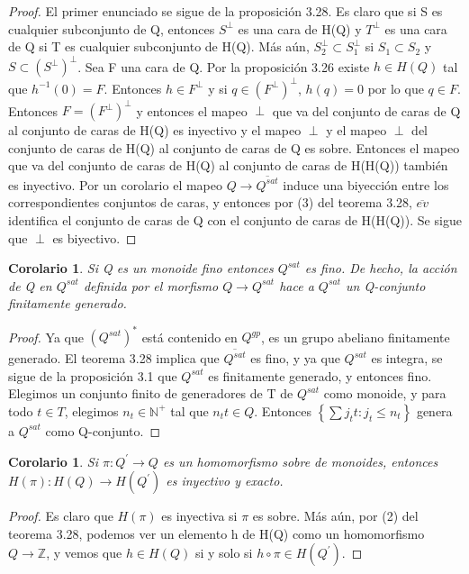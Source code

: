 \documentclass[12pt,spanish]{amsart}
\newcommand{\bb}[1]{\mathbb{#1}}
\newcommand{\set}[1]{\left\{{#1}\right\}}
\newtheorem{cor}[Theorem]{Corolario}
\theoremstyle{definition}
\theoremstyle{remark}
\begin{document}
\begin{proof}
El primer enunciado se sigue de la proposición 3.28. Es claro que si S es cualquier subconjunto de Q, entonces $S^{\perp}$ es una cara de H(Q) y $T^{\perp}$ es una cara de Q si T es cualquier subconjunto de H(Q). Más aún, $S_{2}^{\perp}\subset S_{1}^{\perp}$ si $S_{1} \subset S_{2}$ y $S \subset (S^{\perp})^{\perp}$. Sea F una cara de Q. Por la proposición 3.26 existe $h\in H(Q)$ tal que $h^{-1}(0)=F$. Entonces $h\in F^{\perp}$ y si $q\in (F^{\perp})^{\perp}$, $h(q)=0$ por lo que $q\in F$. Entonces $F=(F^{\perp})^{\perp}$ y entonces el mapeo $\perp$ que va del conjunto de caras de Q al conjunto de caras de H(Q) es inyectivo y el mapeo $\perp$ y el mapeo $\perp$ del conjunto de caras de H(Q) al conjunto de caras de Q es sobre. Entonces el mapeo que va del conjunto de caras de H(Q) al conjunto de caras de H(H(Q)) también es inyectivo. Por un corolario el mapeo $Q \to \overline{Q^{sat}}$ induce una biyección entre los correspondientes conjuntos de caras, y entonces por (3) del teorema 3.28, $\overline{ev}$ identifica el conjunto de caras de Q con el conjunto de caras de H(H(Q)). Se sigue que $\perp$ es biyectivo. 
\end{proof}

\begin{cor}
Si Q es un monoide fino entonces $Q^{sat}$ es fino. De hecho, la acción de Q en $Q^{sat}$ definida por el morfismo $Q \to Q^{sat}$ hace a $Q^{sat}$ un Q-conjunto finitamente generado.  
\end{cor}

\begin{proof}
Ya que $(Q^{sat})^{\ast}$ está contenido en $Q^{gp}$, es un grupo abeliano finitamente generado. El teorema 3.28 implica que $\overline{Q^{sat}}$ es fino, y ya que $Q^{sat}$ es integra, se sigue de la proposición 3.1 que $Q^{sat}$ es finitamente generado, y entonces fino. Elegimos un conjunto finito de generadores de T de $Q^{sat}$ como monoide, y para todo $t\in T$, elegimos $n_{t}\in \bb{N}^{+}$ tal que $n_{t}t\in Q$. Entonces $\set{\sum j_{t}t:j_{t}\leq n_{t}}$ genera a $Q^{sat}$ como Q-conjunto.    
\end{proof}

\begin{cor}
Si $\pi:Q^{\prime} \to Q$ es un homomorfismo sobre de monoides, entonces $H(\pi): H(Q) \to H(Q^{\prime})$ es inyectivo y exacto.  
\end{cor}

\begin{proof}
Es claro que $H(\pi)$ es inyectiva si $\pi$ es sobre. Más aún, por (2) del teorema 3.28, podemos ver un elemento h de H(Q) como un homomorfismo $Q \to \bb{Z}$, y vemos que $h\in H(Q)$ si y solo si $h\circ \pi \in H(Q^{\prime})$.  
\end{proof}
\end{document}
